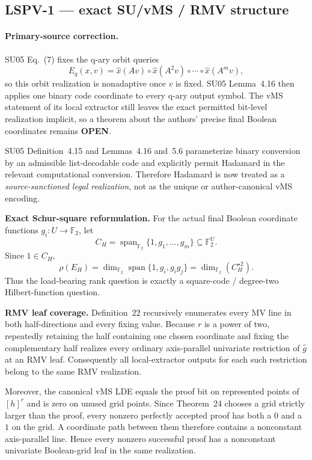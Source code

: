 \documentclass[11pt]{article}
\newcommand{\statusopen}{\textcolor{openstatus}{\textbf{OPEN}}}
\newcommand{\Ftwo}{\mathbb{F}_2}
\begin{document}
\subsection{LSPV-1 --- exact SU/vMS / RMV structure}

\paragraph{Primary-source correction.}
SU05 Eq.~(7) fixes the q-ary orbit queries
\[
E_q(x,v)=\widehat x(Av)\circ\widehat x(A^2v)\circ\cdots\circ\widehat x(A^m v),
\]
so this orbit realization is nonadaptive once $v$ is fixed. SU05 Lemma~4.16 then applies one
binary code coordinate to every q-ary output symbol. The vMS statement of its local extractor
still leaves the exact permitted bit-level realization implicit, so a theorem about the authors'
precise final Boolean coordinates remains \statusopen.

SU05 Definition~4.15 and Lemmas~4.16 and~5.6 parameterize binary conversion by an admissible
list-decodable code and explicitly permit Hadamard in the relevant computational conversion.
Therefore Hadamard is now treated as a \emph{source-sanctioned legal realization}, not as the unique
or author-canonical vMS encoding.

\begin{provedbox}
\textbf{Exact Schur-square reformulation.}
For the actual final Boolean coordinate functions $g_i:U\to\Ftwo$, let
\[
C_H=\operatorname{span}_{\Ftwo}\{1,g_1,\ldots,g_m\}\subseteq\Ftwo^U.
\]
Since $1\in C_H$,
\[
\boxed{
\rho(E_H)=
\dim_{\Ftwo}\operatorname{span}\{1,g_i,g_i g_j\}
=
\dim_{\Ftwo}(C_H^{\star2}).
}
\]
Thus the load-bearing rank question is exactly a square-code / degree-two Hilbert-function question.
\end{provedbox}

\begin{provedbox}
\textbf{RMV leaf coverage.}
Definition~22 recursively enumerates every MV line in both half-directions and every fixing value.
Because $r$ is a power of two, repeatedly retaining the half containing one chosen coordinate and
fixing the complementary half realizes every ordinary axis-parallel univariate restriction of
$\widehat g$ at an RMV leaf. Consequently all local-extractor outputs for each such restriction
belong to the same RMV realization.

Moreover, the canonical vMS LDE equals the proof bit on represented points of $[h]^r$ and is zero
on unused grid points. Since Theorem~24 chooses a grid strictly larger than the proof, every
nonzero perfectly accepted proof has both a $0$ and a $1$ on the grid. A coordinate path between
them therefore contains a nonconstant axis-parallel line. Hence every nonzero successful proof has
a nonconstant univariate Boolean-grid leaf in the same realization.
\end{provedbox}
\end{document}
